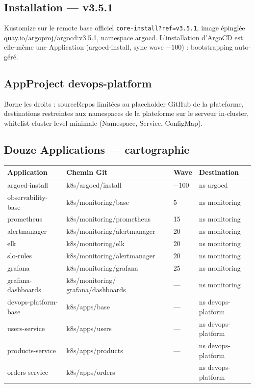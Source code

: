 \documentclass[12pt,a4paper,twoside,openright]{report}
\begin{document}
\subsection{Installation --- v3.5.1}
Kustomize sur le remote base officiel \texttt{core-install?ref=v3.5.1}, image épinglée quay.io/argoproj/argocd:v3.5.1, namespace argocd. L'installation d'ArgoCD est elle-même une Application (argocd-install, sync wave $-100$) : bootstrapping auto-géré.

\subsection{AppProject devops-platform}
Borne les droits : sourceRepos limitées au placeholder GitHub de la plateforme, destinations restreintes aux namespaces de la plateforme sur le serveur in-cluster, whitelist cluster-level minimale (Namespace, Service, ConfigMap).

\subsection{Douze Applications --- cartographie}
\begin{center}\label{tab:ch-argocd-douze-applications-cartographie}\end{center}
\begin{longtable}{@{}p{3.4cm}p{5.2cm}p{1.6cm}p{3.4cm}@{}}
\toprule
\textbf{Application} & \textbf{Chemin Git} & \textbf{Wave} & \textbf{Destination} \\
\midrule
\endhead
argocd-install & k8s/argocd/install & $-100$ & ns argocd \\
observability-base & k8s/monitoring/base & 5 & ns monitoring \\
prometheus & k8s/monitoring/prometheus & 15 & ns monitoring \\
alertmanager & k8s/monitoring/alertmanager & 20 & ns monitoring \\
elk & k8s/monitoring/elk & 20 & ns monitoring \\
slo-rules & k8s/monitoring/alertmanager & 20 & ns monitoring \\
grafana & k8s/monitoring/grafana & 25 & ns monitoring \\
grafana-dashboards & k8s/monitoring/ grafana/dashboards & --- & ns monitoring \\
devops-platform-base & k8s/apps/base & --- & ns devops-platform \\
users-service & k8s/apps/users & --- & ns devops-platform \\
products-service & k8s/apps/products & --- & ns devops-platform \\
orders-service & k8s/apps/orders & --- & ns devops-platform \\
\bottomrule
\end{longtable}
\end{document}
